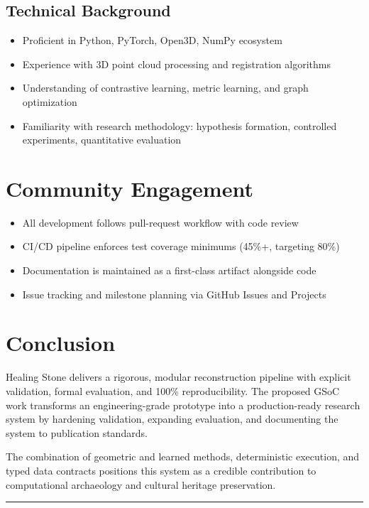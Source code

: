 \documentclass[11pt,a4paper]{article}
\begin{document}
\subsection{Technical Background}

\begin{itemize}[leftmargin=*]
    \item Proficient in Python, PyTorch, Open3D, NumPy ecosystem
    \item Experience with 3D point cloud processing and registration algorithms
    \item Understanding of contrastive learning, metric learning, and graph optimization
    \item Familiarity with research methodology: hypothesis formation, controlled experiments, quantitative evaluation
\end{itemize}

\section{Community Engagement}

\begin{itemize}[leftmargin=*]
    \item All development follows pull-request workflow with code review
    \item CI/CD pipeline enforces test coverage minimums (45\%+, targeting 80\%)
    \item Documentation is maintained as a first-class artifact alongside code
    \item Issue tracking and milestone planning via GitHub Issues and Projects
\end{itemize}

\section{Conclusion}

Healing Stone delivers a rigorous, modular reconstruction pipeline with explicit validation, formal evaluation, and 100\% reproducibility. The proposed GSoC work transforms an engineering-grade prototype into a production-ready research system by hardening validation, expanding evaluation, and documenting the system to publication standards.

The combination of geometric and learned methods, deterministic execution, and typed data contracts positions this system as a credible contribution to computational archaeology and cultural heritage preservation.

\vspace{1cm}
\begin{center}
\rule{0.5\textwidth}{0.5pt}
\end{center}



\end{document}

